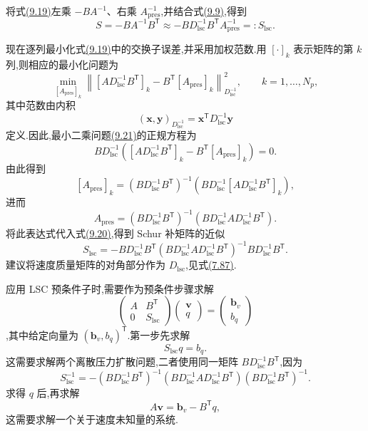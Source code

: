 \begin{example}
将式\hyperref[eq:chapter9-lsc-commutator]{(9.19)}左乘 $-BA^{-1}$、右乘 $A_{\mathrm{pres}}^{-1}$,并结合式\hyperref[eq:chapter9-schur-complement]{(9.9)},得到
\begin{equation}\label{eq:chapter9-lsc-schur-first}
S=-BA^{-1}B^{\mathsf T}\approx
-BD_{\mathrm{lsc}}^{-1}B^{\mathsf T}A_{\mathrm{pres}}^{-1}
=:S_{\mathrm{lsc}}.
\end{equation}

现在逐列最小化式\hyperref[eq:chapter9-lsc-commutator]{(9.19)}中的交换子误差,并采用加权范数.用 $[\cdot]_k$ 表示矩阵的第 $k$ 列,则相应的最小化问题为
\begin{equation}\label{eq:chapter9-lsc-least-squares}
\min_{[A_{\mathrm{pres}}]_k}
\left\|\left[AD_{\mathrm{lsc}}^{-1}B^{\mathsf T}\right]_k
-B^{\mathsf T}[A_{\mathrm{pres}}]_k\right\|_{D_{\mathrm{lsc}}^{-1}}^2,
\qquad k=1,\ldots,N_p,
\end{equation}
其中范数由内积
\[
(\bm x,\bm y)_{D_{\mathrm{lsc}}^{-1}}
=\bm x^{\mathsf T}D_{\mathrm{lsc}}^{-1}\bm y
\]
定义.因此,最小二乘问题\hyperref[eq:chapter9-lsc-least-squares]{(9.21)}的正规方程为
\[
BD_{\mathrm{lsc}}^{-1}
\left(\left[AD_{\mathrm{lsc}}^{-1}B^{\mathsf T}\right]_k
-B^{\mathsf T}[A_{\mathrm{pres}}]_k\right)=0.
\]
由此得到
\[
[A_{\mathrm{pres}}]_k
=(BD_{\mathrm{lsc}}^{-1}B^{\mathsf T})^{-1}
\left(BD_{\mathrm{lsc}}^{-1}
\left[AD_{\mathrm{lsc}}^{-1}B^{\mathsf T}\right]_k\right),
\]
进而
\[
A_{\mathrm{pres}}
=(BD_{\mathrm{lsc}}^{-1}B^{\mathsf T})^{-1}
(BD_{\mathrm{lsc}}^{-1}AD_{\mathrm{lsc}}^{-1}B^{\mathsf T}).
\]
将此表达式代入式\hyperref[eq:chapter9-lsc-schur-first]{(9.20)},得到 Schur 补矩阵的近似
\begin{equation}\label{eq:chapter9-lsc-schur}
S_{\mathrm{lsc}}
=-BD_{\mathrm{lsc}}^{-1}B^{\mathsf T}
(BD_{\mathrm{lsc}}^{-1}AD_{\mathrm{lsc}}^{-1}B^{\mathsf T})^{-1}
BD_{\mathrm{lsc}}^{-1}B^{\mathsf T}.
\end{equation}
\textcite{Elman2006} 建议将速度质量矩阵的对角部分作为 $D_{\mathrm{lsc}}$,见式\hyperref[eq:theta-temporal-mass-matrix]{(7.87)}.

应用 LSC 预条件子时,需要作为预条件步骤求解
\[
\begin{pmatrix}A&B^{\mathsf T}\\0&S_{\mathrm{lsc}}\end{pmatrix}
\begin{pmatrix}\bm v\\q\end{pmatrix}
=\begin{pmatrix}\bm b_v\\b_q\end{pmatrix}
\]
,其中给定向量为 $(\bm b_v,b_q)^{\mathsf T}$.第一步先求解
\[
S_{\mathrm{lsc}}q=b_q.
\]
这需要求解两个离散压力扩散问题,二者使用同一矩阵 $BD_{\mathrm{lsc}}^{-1}B^{\mathsf T}$,因为
\begin{equation}\label{eq:chapter9-lsc-schur-inverse}
S_{\mathrm{lsc}}^{-1}
=-(BD_{\mathrm{lsc}}^{-1}B^{\mathsf T})^{-1}
(BD_{\mathrm{lsc}}^{-1}AD_{\mathrm{lsc}}^{-1}B^{\mathsf T})
(BD_{\mathrm{lsc}}^{-1}B^{\mathsf T})^{-1}.
\end{equation}
求得 $q$ 后,再求解
\[
A\bm v=\bm b_v-B^{\mathsf T}q,
\]
这需要求解一个关于速度未知量的系统.
\end{example}

